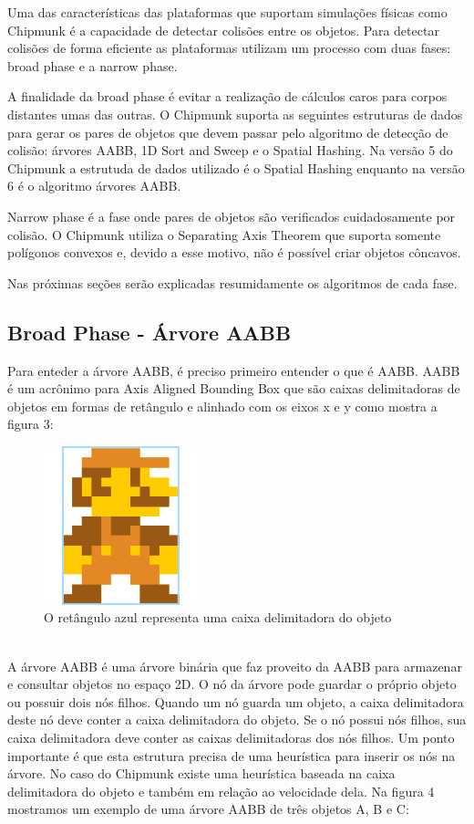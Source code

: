 Uma das características das plataformas que suportam simulações físicas como Chipmunk é a capacidade de detectar colisões entre os objetos. 
Para detectar colisões de forma eficiente as plataformas utilizam um processo com duas fases: broad phase e a narrow phase. 

A finalidade da broad phase é evitar a realização de cálculos caros para corpos distantes umas das outras. O Chipmunk suporta as seguintes estruturas de dados para
gerar os pares de objetos que devem passar pelo algoritmo de detecção de colisão:
árvores AABB, 1D Sort and Sweep e o Spatial Hashing. Na versão 5 do Chipmunk a estrutuda de dados utilizado é o Spatial Hashing enquanto na versão 6
é o algoritmo árvores AABB. 

Narrow phase é a fase onde pares de objetos são verificados cuidadosamente por colisão. O Chipmunk utiliza o Separating Axis Theorem que suporta somente 
polígonos convexos e, devido a esse motivo, não é possível criar objetos côncavos.

Nas próximas seções serão explicadas resumidamente os algoritmos de cada fase.

\subsection{Broad Phase - Árvore AABB}

Para enteder a árvore AABB, é preciso primeiro entender o que é AABB. AABB é um acrônimo para Axis Aligned Bounding Box que são caixas delimitadoras de objetos 
em formas de retângulo e alinhado com os eixos x e y como mostra a figura 3:

\begin{figure}[!htbp]
  \centering
  \includegraphics[scale=0.3]{mario_bb.png}
  \caption{O retângulo azul representa uma caixa delimitadora do objeto}
\end{figure}

\ \\
A árvore AABB é uma árvore binária que faz proveito da AABB para armazenar e consultar objetos no espaço 2D. O nó da árvore pode guardar o próprio objeto 
ou possuir dois nós filhos. Quando um nó guarda um objeto, a caixa delimitadora deste nó deve conter a caixa delimitadora do objeto. Se o nó possui nós filhos, 
sua caixa delimitadora deve conter as caixas delimitadoras dos nós filhos. 
Um ponto importante é que esta estrutura precisa de uma heurística para inserir os nós na árvore. No caso do Chipmunk existe uma heurística baseada na caixa 
delimitadora do objeto e também em relação ao velocidade dela. Na figura 4 mostramos um exemplo de uma árvore AABB de três objetos A, B e C: 


